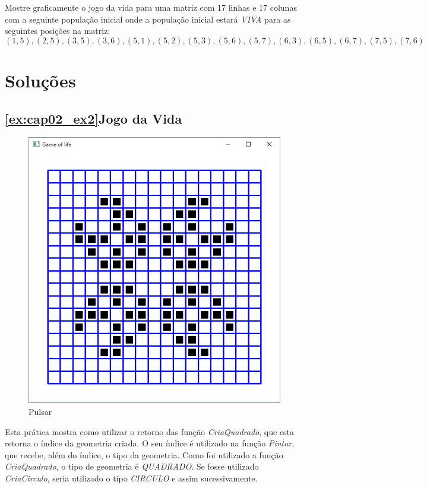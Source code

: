 





\begin{problems}
\prob
Mostre graficamente o jogo da vida para uma matriz com 17 linhas e 17 colunas com a seguinte população inicial onde a população inicial estará \emph{VIVA} para as seguintes posições na matriz:
$$
  (1,5), (2,5), (3,5), (3,6), (5,1), (5,2), (5,3), (5,6), (5,7), (6,3), (6,5), (6,7), (7,5), (7,6)
$$
\label{ex:cap02_ex2}
\end{problems}

\section{Soluções}

\subsection{\ref{ex:cap02_ex2}Jogo da Vida}
\begin{figure}[ht]
  \centerline{\includegraphics[width=.5\textwidth]{img/cap2_ex9.png}}
  \caption{Pulsar}
  \label{fig:cap02_ex2}
\end{figure}
Esta prática mostra como utilizar o retorno das função \emph{CriaQuadrado}, que esta retorna o índice da geometria criada. O seu índice é utilizado na função \emph{Pintar}, que recebe, além do índice, o tipo da geometria. Como foi utilizado a função \emph{CriaQuadrado}, o tipo de geometria é \emph{QUADRADO}. Se fosse utilizado \emph{CriaCirculo}, seria utilizado o tipo \emph{CIRCULO} e assim sucessivamente.

